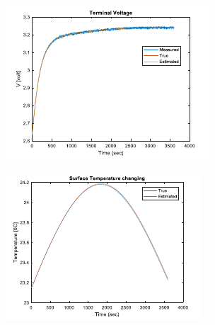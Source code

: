 \documentclass[12pt]{article}
\begin{document}
\begin{figure}[H]
	\centering
	\begin{subfigure}[t]{0.3\linewidth}
		\includegraphics[width=\linewidth]{figures/estVoltPar1.pdf}
	\end{subfigure}
	\begin{subfigure}[t]{0.3\linewidth}
		\includegraphics[width=\linewidth]{figures/estVoltPar2.pdf}
	\end{subfigure}	
	\begin{subfigure}[t]{0.3\linewidth}

\end{subfigure}
\end{figure}
\end{document}
